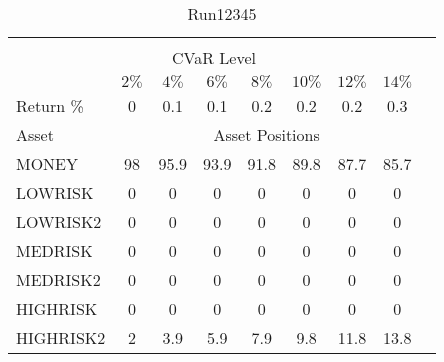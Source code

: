 \begin{table}[h!t]
\caption{Run12345}
\centering
\begin{tabular}[t]{ l c c c c c c c c }
\hline\hline \\
\multicolumn{8}{c}{CVaR Level} \\
 & $2\%$ & $4\%$ & $6\%$ & $8\%$ & $10\%$ & $12\%$ & $14\%$ \\[0.5ex]
Return \% &0 &0.1 &0.1 &0.2 &0.2 &0.2 &0.3\\[0.5ex]
Asset & \multicolumn{7}{c}{Asset Positions} \\[1ex]
MONEY & 98 & 95.9 & 93.9 & 91.8 & 89.8 & 87.7 & 85.7\\
LOWRISK & 0 & 0 & 0 & 0 & 0 & 0 & 0\\
LOWRISK2 & 0 & 0 & 0 & 0 & 0 & 0 & 0\\
MEDRISK & 0 & 0 & 0 & 0 & 0 & 0 & 0\\
MEDRISK2 & 0 & 0 & 0 & 0 & 0 & 0 & 0\\
HIGHRISK & 0 & 0 & 0 & 0 & 0 & 0 & 0\\
HIGHRISK2 & 2 & 3.9 & 5.9 & 7.9 & 9.8 & 11.8 & 13.8\\
[1ex] \hline
\end{tabular}
\end{table} 